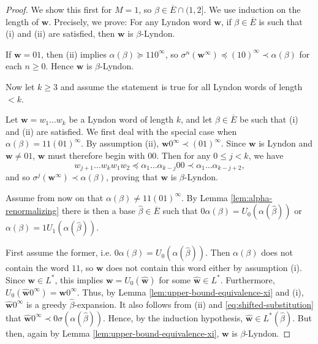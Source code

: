 \documentclass[11pt]{amsart}
\theoremstyle{definition}
\theoremstyle{remark}
\numberwithin{equation}{section}
\newcommand{\w}{\mathbf{w}}
\newcommand{\f}{\infty}
\newcommand{\al}{\alpha}
\newcommand{\lle}{\preccurlyeq}
\newcommand{\lge}{\succcurlyeq}
\newcommand{\si}{\sigma}
\begin{document}
\begin{proof}
{We show this first for $M=1$, so $\beta\in\overline{E}\cap(1,2]$.}
We use induction on the length of $\w$. Precisely, we prove: For any Lyndon word $\w$, if $\beta\in\overline{E}$ is such that (i) and (ii) are satisfied, then $\w$ is $\beta$-Lyndon.

If $\w=01$, then (ii) implies $\al(\beta)\lge 110^\f$, so $\si^n(\w^\f)\lle(10)^\f\prec\al(\beta)$ for each $n\geq 0$. Hence $\w$ is $\beta$-Lyndon.

Now let $k\geq 3$ and assume the statement is true for all Lyndon words of length $<k$. {Let $\w=w_1\dots w_k$ be a Lyndon word of length $k$, and let $\beta\in\overline{E}$ be such that (i) and (ii) are satisfied. We first deal with the special case when $\al(\beta)=11(01)^\f$. By assumption (ii), $\w0^\f\prec (01)^\f$. Since $\w$ is Lyndon and $\w\neq 01$, $\w$ must therefore begin with $00$. Then for any $0\leq j<k$, we have
\[
w_{j+1}\dots w_k w_1w_2\lle \al_1\dots\al_{k-j}00\prec\al_1\dots\al_{k-j+2},
\]
and so $\si^j(\w^\f)\prec\al(\beta)$, proving that $\w$ is $\beta$-Lyndon.

Assume from now on that $\al(\beta)\neq 11(01)^\f$. By Lemma \ref{lem:alpha-renormalizing} there is then a base $\hat{\beta}\in \overline{E}$ such that $0\al(\beta)=U_0(\al(\hat{\beta}))$ or $\al(\beta)=1U_1(\al(\hat{\beta}))$.
}

First assume the former, i.e. $0\al(\beta)=U_0(\al(\hat{\beta}))$. Then $\al(\beta)$ does not contain the word $11$, so $\w$ does not contain this word either by assumption (i). Since $\w\in L^*$, this implies $\w=U_0(\hat{\w})$ for some $\hat{\w}\in L^*$. Furthermore, $U_0(\hat{\w}0^\f)=\w0^\f$. Thus, by Lemma \ref{lem:upper-bound-equivalence-xi} {and (i)}, $\hat{\w}0^\f$ is a greedy $\hat{\beta}$-expansion. It also follows from (ii) and \eqref{eq:shifted-substitution} that $\hat{\w}0^\f\prec 0\si(\al(\hat{\beta}))$. Hence, by the induction hypothesis, $\hat{\w}\in L^*(\hat{\beta})$. But then, again by Lemma \ref{lem:upper-bound-equivalence-xi}, $\w$ is $\beta$-Lyndon.


\end{proof}
\end{document}
